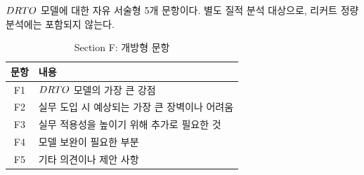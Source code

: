 \label{app:survey-f}

{$DRTO$ 모델에 대한 자유 서술형 5개 문항이다. 별도 질적 분석 대상으로,
리커트 정량 분석에는 포함되지 않는다.}

\begin{table}[htbp]
\centering
\caption{Section F: 개방형 문항}
\label{tab:app-survey-items-f}
\small
\begin{tabularx}{\textwidth}{cX}
\toprule
\textbf{문항} & \textbf{내용} \\
\midrule
{F1} & {$DRTO$ 모델의 가장 큰 강점} \\
{F2} & {실무 도입 시 예상되는 가장 큰 장벽이나 어려움} \\
{F3} & {실무 적용성을 높이기 위해 추가로 필요한 것} \\
{F4} & {모델 보완이 필요한 부분} \\
{F5} & {기타 의견이나 제안 사항} \\
\bottomrule
\end{tabularx}
\end{table}






